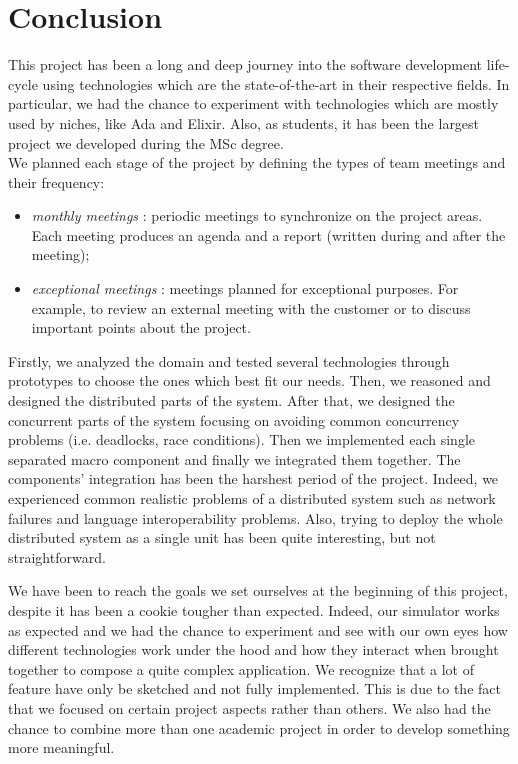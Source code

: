 \section{Conclusion}



This project has been a long and deep journey into the software development life-cycle
using technologies which are the state-of-the-art in their respective fields.
In particular, we had the chance to experiment
with technologies which are mostly used by
niches, like Ada and Elixir.
Also, as students, it has been the largest project we developed during the MSc degree.
\\

We planned each stage of the project by defining the
types of team meetings and their frequency:
\begin{itemize}
	\item \textit{monthly meetings} : periodic meetings to synchronize on the
	project areas. Each meeting produces an agenda and a report
	(written during and after the meeting);
	\item \textit{exceptional meetings} : meetings planned
	for exceptional purposes.
	For example, to review an external meeting with the customer
	or to discuss important points about the project.
\end{itemize}

Firstly, we analyzed the domain and tested several technologies through
prototypes to choose the ones which best fit our needs.
Then, we reasoned and designed the distributed parts of the system.
After that, we designed the concurrent parts of the system focusing
on avoiding common concurrency problems (i.e. deadlocks, race conditions).
Then we implemented each single separated macro component
and finally we integrated
them together. The components' integration has been
the harshest period of the project.
Indeed, we experienced common realistic problems of
a distributed system such as network failures and language interoperability
problems. Also, trying to deploy the whole distributed system as a single unit
has been quite interesting, but not straightforward.

We have been to reach the goals we set ourselves at the beginning of this
project, despite it has been a cookie tougher than expected.
Indeed, our simulator works as expected and we had the chance to experiment
and see with our own eyes how different technologies work under the hood and
how they interact when brought
together to compose a quite complex application.
We recognize that a lot of feature have only be sketched and not fully
implemented. This is due to the fact that we focused on certain project aspects
rather than others.
We also had the chance to combine more than one academic project in order to
develop something more meaningful.

